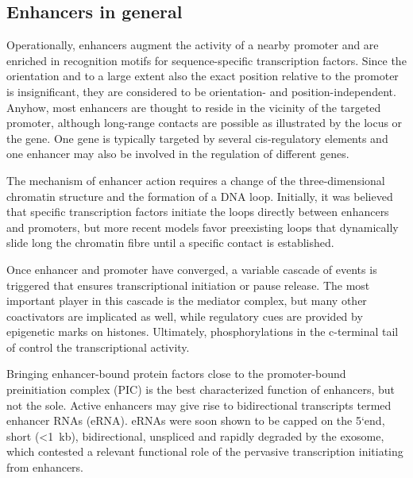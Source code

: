 \subsection{Enhancers in general}
\label{chap:i:abridged:enhancers:general}

Operationally, enhancers augment the activity of a nearby promoter and are enriched in recognition motifs for sequence-specific transcription factors. Since the orientation and to a large extent also the exact position relative to the promoter is insignificant, they are considered to be orientation- and position-independent. Anyhow, most enhancers are thought to reside in the vicinity of the targeted promoter, although long-range contacts are possible\cite{Sanyal2012,Mifsud2015} as illustrated by the  locus \cite{Fulco2016} or the  gene\cite{Lettice2003}. One gene is typically targeted by several cis-regulatory elements and one enhancer may also be involved in the regulation of different genes\cite{Hughes2014,Bertolino2016,Javierre2016}. 

The mechanism of enhancer action requires a change of the three-dimensional chromatin structure and the formation of a DNA loop\cite{Arensbergen2014}. Initially, it was believed that specific transcription factors initiate the loops directly between enhancers and promoters\cite{Drissen2004,Vakoc2005}, but more recent models favor preexisting loops that dynamically slide long the chromatin fibre until a specific contact is established\cite{Jin2013,Haarhuis2017}.

Once enhancer and promoter have converged, a variable cascade of events is triggered that ensures transcriptional initiation or pause release. The most important player in this cascade is the mediator complex\cite{Kornberg2005,Robinson2016}, but many other coactivators\cite{Kaiser1996} are implicated as well, while regulatory cues are provided by epigenetic marks on histones\cite{Ogryzko1996,Spencer1997}. Ultimately, phosphorylations in the c-terminal tail of  control the transcriptional activity\cite{Hirose2007}. 

Bringing enhancer-bound protein factors close to the promoter-bound preinitiation complex (PIC) is the best characterized function of enhancers, but not the sole. Active enhancers may give rise to bidirectional transcripts termed enhancer RNAs (eRNA)\cite{Kim2010,DeSanta2010,Zhu2013a}. eRNAs were soon shown to be capped on the 5\lq end, short (\textless\SI{1}{kb}), bidirectional, unspliced and rapidly degraded by the exosome\cite{Koch2011,Andersson2014,Core2014}, which contested a relevant functional role of the pervasive transcription initiating from enhancers. 

